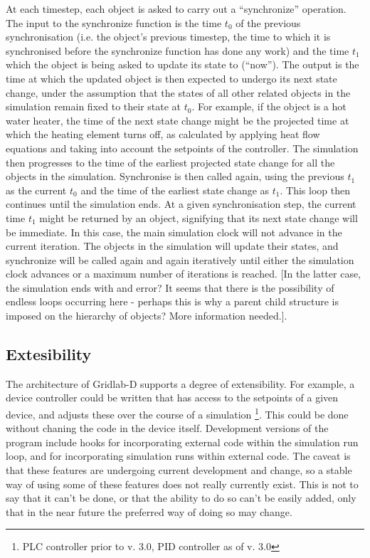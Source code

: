 \documentclass[12pt]{article}
\begin{document}
At each timestep, each object is asked to carry out a ``synchronize'' operation. The input to the synchronize function is the time $t_0$ of the previous synchronisation (i.e. the object's previous timestep, the time to which it is synchronised before the synchronize function has done any work) and the time $t_1$ which the object is being asked to update its state to (``now''). The output is the time at which the updated object is then expected to undergo its next state change, under the assumption that the states of all other related objects in the simulation remain fixed to their state at $t_0$. For example, if the object is a hot water heater, the time of the next state change might be the projected time at which the heating element turns off, as calculated by applying heat flow equations and taking into account the setpoints of the controller. The simulation then progresses to the time of the earliest projected state change for all the objects in the simulation. Synchronise is then called again, using the previous $t_1$ as the current $t_0$ and the time of the earliest state change as $t_1$. This loop then continues until the simulation ends. At a given synchronisation step, the current time $t_1$ might be returned by an object, signifying that its next state change will be immediate. In this case, the main simulation clock will not advance in the current iteration.  The objects in the simulation will update their states, and synchronize will be called again and again iteratively until either the simulation clock advances or a maximum number of iterations is reached. [In the latter case, the simulation ends with and error? It seems that there is the possibility of endless loops occurring here - perhaps this is why a parent child structure is imposed on the hierarchy of objects? More information needed.].

\subsection{Extesibility}

The architecture of Gridlab-D supports a degree of extensibility. For example, a device controller could be written that has access to the setpoints of a given device, and adjusts these over the course of a simulation \footnote{PLC controller prior to v. 3.0, PID controller as of v. 3.0}. This could be done without chaning the code in the device itself. Development versions of the program include hooks for incorporating external code within the simulation run loop, and for incorporating simulation runs within external code. The caveat is that these features are undergoing current development and change, so a stable way of using some of these features does not really currently exist. This is not to say that it can't be done, or that the ability to do so can't be easily added, only that in the near future the preferred way of doing so may change.
\end{document}
